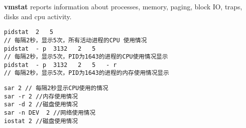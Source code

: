 \textbf{vmstat} reports information about processes, memory, paging, block IO, traps, disks and cpu activity.

\begin{verbatim}
pidstat  2   5  
// 每隔2秒，显示5次，所有活动进程的CPU 使用情况 
pidstat  - p  3132   2   5  
// 每隔2秒，显示5次，PID为1643的进程的CPU使用情况显示 
pidstat  - p  3132   2   5   - r
// 每隔2秒，显示5次，PID为1643的进程的内存使用情况显示
\end{verbatim}

\begin{verbatim}
sar 2 // 每隔2秒显示CPU使用的情况										
sar -r 2 //内存使用情况					 
sar -d 2 //磁盘使用情况					 
sar -n DEV  2 //网络使用情况
iostat 2 //磁盘使用情况
\end{verbatim}



